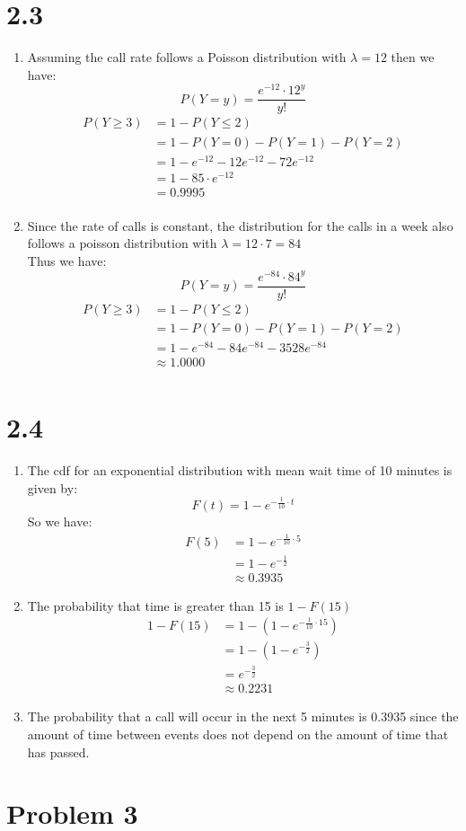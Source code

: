 \documentclass{article}
\begin{document}
\section*{2.3}
\begin{enumerate}
\item Assuming the call rate follows a Poisson distribution with $\lambda = 12$ then we have: \\
\[
P(Y = y) = \frac{e^{-12} \cdot 12^y}{y!}
\]
\begin{align*}
P(Y \geq 3) &= 1 - P(Y \leq 2) \\
&= 1 - P(Y = 0) - P(Y = 1) - P(Y = 2) \\
&= 1 - e^{-12} - 12e^{-12} - 72e^{-12} \\
&= 1 - 85 \cdot e^{-12} \\
&= 0.9995 \\
\end{align*}
\item Since the rate of calls is constant, the distribution for the calls in a week also follows a poisson distribution with $\lambda = 12 \cdot 7 = 84$ \\
Thus we have: \\
\[
P(Y = y) = \frac{e^{-84} \cdot 84^y}{y!}
\]
\begin{align*}
P(Y \geq 3) &= 1 - P(Y \leq 2) \\
&= 1 - P(Y = 0) - P(Y = 1) - P(Y = 2) \\
&= 1 - e^{-84} - 84e^{-84} - 3528e^{-84} \\
&\approx 1.0000 \\
\end{align*}
\end{enumerate}
\section*{2.4}
\begin{enumerate}
\item The cdf for an exponential distribution with mean wait time of 10 minutes is given by: \\
\[
F(t) = 1 - e^{-\frac{1}{10} \cdot t}
\]
So we have: \\
\begin{align*}
F(5) &= 1 - e^{-\frac{1}{10} \cdot 5} \\
&= 1 - e^{-\frac{1}{2}} \\
&\approx 0.3935
\end{align*}
\item The probability that time is greater than 15 is $1 - F(15)$
\begin{align*}
1 - F(15) &= 1 - (1 - e^{-\frac{1}{10} \cdot 15}) \\
&= 1 - (1 - e^{-\frac{3}{2}}) \\
&= e^{-\frac{3}{2}} \\
&\approx 0.2231
\end{align*}
\item The probability that a call will occur in the next 5 minutes is 0.3935 since the amount of time between events does not depend on the amount of time that has passed. \\
\end{enumerate}
\section*{Problem 3}
\end{document}

